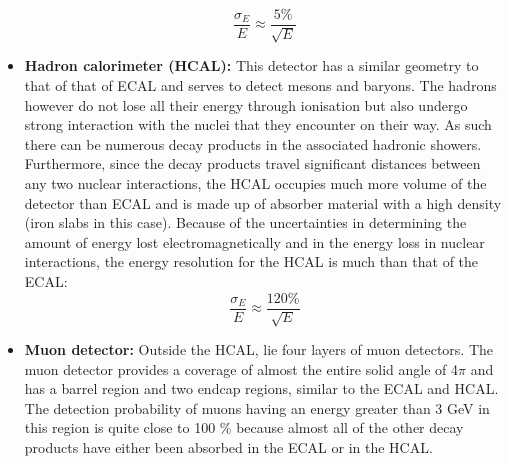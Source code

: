 \begin{itemize}
\begin{equation}
\dfrac{\sigma_{E}}{E}\approx \dfrac{5 \%}{\sqrt{E}}
\end{equation}
\item \textbf{Hadron calorimeter (HCAL):} This detector has a similar geometry to that of that of ECAL and serves to detect mesons and baryons. The hadrons however do not lose all their energy through ionisation but also undergo strong interaction with the nuclei that they encounter on their way. As such there can be numerous decay products in the associated hadronic showers. Furthermore, since the decay products travel significant distances between any two nuclear interactions, the HCAL occupies much more volume of the detector than ECAL and is made up of absorber material with a high density (iron slabs in this case). Because of the uncertainties in determining the amount of energy lost electromagnetically and in the energy loss in nuclear interactions, the energy resolution for the HCAL is much than that of the ECAL:
\begin{equation}
\dfrac{\sigma_{E}}{E}\approx \dfrac{120 \%}{\sqrt{E}}
\end{equation} 
\item \textbf{Muon detector:} Outside the HCAL, lie four layers of muon detectors. The muon detector provides a coverage of almost the entire solid angle of 4$\pi$ and has a barrel region and two endcap regions, similar to the ECAL and HCAL. The detection probability of muons having an energy greater than 3 GeV in this region is quite close to 100 \% because almost all of the other decay products have either been absorbed in the ECAL or in the HCAL.
\end{itemize}
